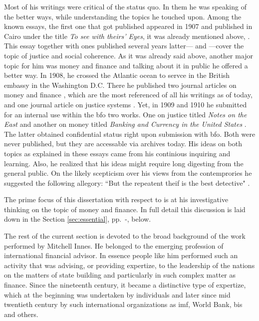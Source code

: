 Most of his writings were critical of the status quo. In them he was speaking of the better ways, while understanding the topics he touched upon. Among the known essays, the first one that got published appeared in 1907 and published in Cairo under the title \textit{To see with theirs' Eyes}, it was already mentioned above, \citep{innes1907}. This essay together with ones published several years latter---\cite{innes1909} and \citep{innes1913_}---cover the topic of justice and social coherence. As it was already said above, another major topic for him was money and finance and talking about it in public he offered a better way. In 1908, he crossed the Atlantic ocean to servce in the British embassy in the Washington D.C. There he published two journal articles on money and finance \citep{innes1913,innes1914}, which are the most referenced of all his writings as of today, and one journal article on justice systems \citep{innes1913_}. Yet, in 1909 and 1910 he submitted for an internal use within the \ac{bfo} two works. One on justice titled \textit{Notes on the East} \citep{innes1909} and another on money titled \textit{Banking and Currency in the United States} \citep{innes1910}. The latter obtained confidential status right upon submission with \ac{bfo}. Both were never published, but they are accessable via archives today. His ideas on both topics as explained in these essays came from his continious inquiring and learning. Also, he realized that his ideas might require long digesting from the general public. On the likely scepticism over his views from the contemprories he suggested the following allegory: ``But the repeatent theif is the best detective" \cite[p.~4]{innes1907}.

The prime focus of this dissertation with respect to \citeauthor{innes1913} is at his investigative thinking on the topic of money and finance. In full detail this discussion is laid down in the Section \ref{sec:essential}, pp.~\pageref{sec:essential}-\pageref{sec:critique}, below. 

The rest of the current section is devoted to the broad background of the work performed by Mitchell Innes. He belonged to the emerging profession of international financial advisor. In essence people like him performed such an activity that was advising, or providing expertize, to the leadership of the nations on the matters of state building and particularly in such complex matter as finance. Since the nineteenth century, it became a distinctive type of expertize, which at the beginning was undertaken by individuals and later since mid twentieth century by such international organizations as \ac{imf}, World Bank, \ac{bis} and others.

